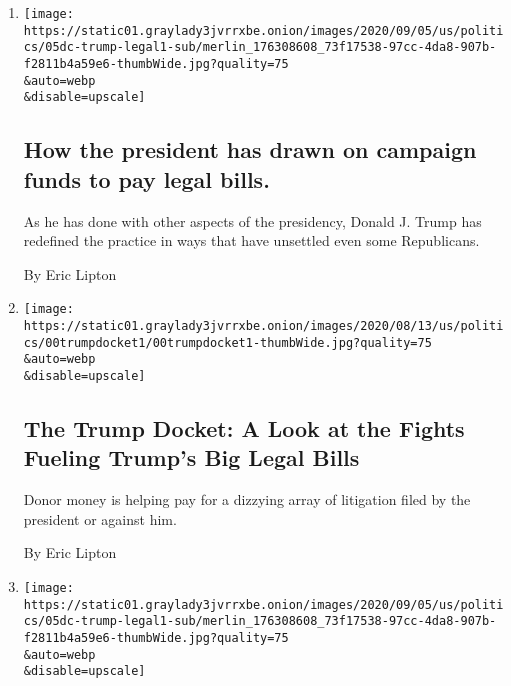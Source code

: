 \begin{enumerate}
\def\labelenumi{\arabic{enumi}.}
\item
  \href{/live/2020/09/07/us/trump-vs-biden/how-the-president-has-drawn-on-campaign-funds-to-pay-legal-bills}{}

  \texttt{[image: https://static01.graylady3jvrrxbe.onion/images/2020/09/05/us/politics/05dc-trump-legal1-sub/merlin\_176308608\_73f17538-97cc-4da8-907b-f2811b4a59e6-thumbWide.jpg?quality=75\\\&auto=webp\\\&disable=upscale]}

  \hypertarget{how-the-president-has-drawn-on-campaign-funds-to-pay-legal-bills}{%
  \subsection{How the president has drawn on campaign funds to pay legal
  bills.}\label{how-the-president-has-drawn-on-campaign-funds-to-pay-legal-bills}}

  As he has done with other aspects of the presidency, Donald J. Trump
  has redefined the practice in ways that have unsettled even some
  Republicans.

  By Eric Lipton
\item
  \href{/2020/09/05/us/politics/trump-docket-legal-bills.html}{}

  \texttt{[image: https://static01.graylady3jvrrxbe.onion/images/2020/08/13/us/politics/00trumpdocket1/00trumpdocket1-thumbWide.jpg?quality=75\\\&auto=webp\\\&disable=upscale]}

  \hypertarget{the-trump-docket-a-look-at-the-fights-fueling-trumps-big-legal-bills}{%
  \subsection{The Trump Docket: A Look at the Fights Fueling Trump's Big
  Legal
  Bills}\label{the-trump-docket-a-look-at-the-fights-fueling-trumps-big-legal-bills}}

  Donor money is helping pay for a dizzying array of litigation filed by
  the president or against him.

  By Eric Lipton
\item
  \href{/2020/09/05/us/politics/trump-campaign-funds-legal-bills.html}{}

  \texttt{[image: https://static01.graylady3jvrrxbe.onion/images/2020/09/05/us/politics/05dc-trump-legal1-sub/merlin\_176308608\_73f17538-97cc-4da8-907b-f2811b4a59e6-thumbWide.jpg?quality=75\\\&auto=webp\\\&disable=upscale]}


\end{enumerate}
